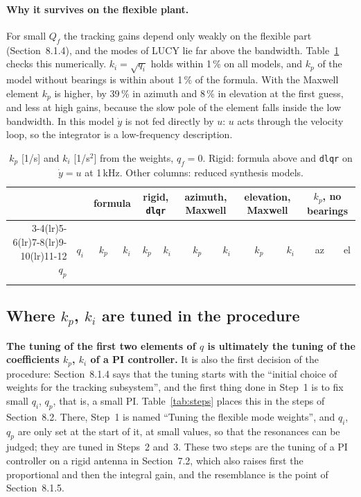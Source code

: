 \documentclass[10pt,a4paper]{article}
\numberwithin{equation}{section}
\begin{document}
\paragraph{Why it survives on the flexible plant.} For small $Q_f$ the tracking gains depend only weakly on the flexible part (Section~8.1.4), and the modes of LUCY lie far above the bandwidth. Table~\ref{tab:qgains} checks this numerically. $k_i=\sqrt{q_i}$ holds within 1\,\% on all models, and $k_p$ of the model without bearings is within about 1\,\% of the formula. With the Maxwell element $k_p$ is higher, by 39\,\% in azimuth and 8\,\% in elevation at the first guess, and less at high gains, because the slow pole of the element falls inside the low bandwidth. In this model $\dot y$ is not fed directly by $u$: $u$ acts through the velocity loop, so the integrator is a low-frequency description.

\begin{table}[H]\centering\footnotesize\setlength{\tabcolsep}{3.5pt}
\caption{$k_p$ [1/s] and $k_i$ [1/s$^2$] from the weights, $q_f=0$. Rigid: formula above and \texttt{dlqr} on $\dot y=u$ at 1\,kHz. Other columns: reduced synthesis models.}\label{tab:qgains}
\begin{tabular}{rrrrrrrrrrrr}\toprule
& & \multicolumn{2}{c}{formula} & \multicolumn{2}{c}{rigid, \texttt{dlqr}} & \multicolumn{2}{c}{azimuth, Maxwell} & \multicolumn{2}{c}{elevation, Maxwell} & \multicolumn{2}{c}{$k_p$, no bearings} \\
\cmidrule(lr){3-4}\cmidrule(lr){5-6}\cmidrule(lr){7-8}\cmidrule(lr){9-10}\cmidrule(lr){11-12}
$q_p$ & $q_i$ & $k_p$ & $k_i$ & $k_p$ & $k_i$ & $k_p$ & $k_i$ & $k_p$ & $k_i$ & az & el \\ \midrule
\\ \bottomrule
\end{tabular}\end{table}

\subsection{Where $k_p$, $k_i$ are tuned in the procedure}
\textbf{The tuning of the first two elements of $q$ is ultimately the tuning of the coefficients $k_p$, $k_i$ of a PI controller.} It is also the first decision of the procedure: Section~8.1.4 says that the tuning starts with the ``initial choice of weights for the tracking subsystem'', and the first thing done in Step~1 is to fix small $q_i$, $q_p$, that is, a small PI. Table~\ref{tab:steps} places this in the steps of Section~8.2. There, Step~1 is named ``Tuning the flexible mode weights'', and $q_i$, $q_p$ are only set at the start of it, at small values, so that the resonances can be judged; they are tuned in Steps~2 and~3. These two steps are the tuning of a PI controller on a rigid antenna in Section~7.2, which also raises first the proportional and then the integral gain, and the resemblance is the point of Section~8.1.5.
\end{document}
